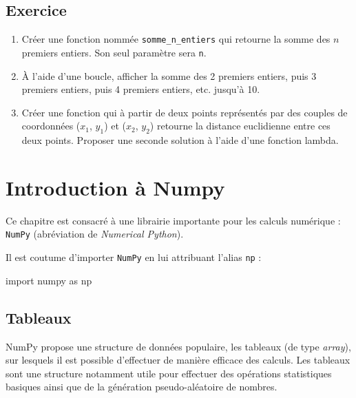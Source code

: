 \documentclass[12pt,]{book}
\newenvironment{Shaded}{\begin{snugshade}}{\end{snugshade}}
\newcommand{\ImportTok}[1]{#1}
\newcommand{\NormalTok}[1]{#1}
\providecommand{\tightlist}{%
  \setlength{\itemsep}{0pt}\setlength{\parskip}{0pt}}
\numberwithin{equation}{section}
\numberwithin{countremarque}{section}
\let\BeginKnitrBlock\begin \let\EndKnitrBlock\end
\begin{document}
\section{Exercice}\label{exercice-6}

\BeginKnitrBlock{exframe}
\begin{enumerate}
\def\labelenumi{\arabic{enumi}.}
\tightlist
\item
  Créer une fonction nommée \texttt{somme\_n\_entiers} qui retourne la
  somme des \(n\) premiers entiers. Son seul paramètre sera \texttt{n}.
\item
  À l'aide d'une boucle, afficher la somme des 2 premiers entiers, puis
  3 premiers entiers, puis 4 premiers entiers, etc. jusqu'à 10.
\item
  Créer une fonction qui à partir de deux points représentés par des
  couples de coordonnées (\(x_1\), \(y_1\)) et (\(x_2\), \(y_2\))
  retourne la distance euclidienne entre ces deux points. Proposer une
  seconde solution à l'aide d'une fonction lambda.
\end{enumerate}
\EndKnitrBlock{exframe}

\chapter{Introduction à Numpy}\label{numpy}

Ce chapitre est consacré à une librairie importante pour les calculs
numérique : \texttt{NumPy} (abréviation de \emph{Numerical Python}).

Il est coutume d'importer \texttt{NumPy} en lui attribuant l'alias
\texttt{np} :

\begin{Shaded}
\begin{Highlighting}[]
\ImportTok{import}\NormalTok{ numpy }\ImportTok{as}\NormalTok{ np}
\end{Highlighting}
\end{Shaded}

\section{Tableaux}\label{numpy-tableaux}

NumPy propose une structure de données populaire, les tableaux (de type
\emph{array}), sur lesquels il est possible d'effectuer de manière
efficace des calculs. Les tableaux sont une structure notamment utile
pour effectuer des opérations statistiques basiques ainsi que de la
génération pseudo-aléatoire de nombres.
\end{document}
